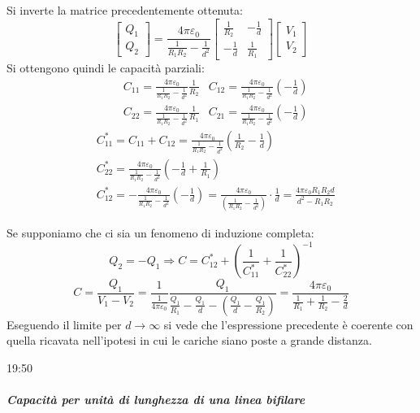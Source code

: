 Si inverte la matrice precedentemente ottenuta:
$$
\begin{bmatrix}
Q_1\\
Q_2
\end{bmatrix} = \frac{4\pi \varepsilon_0}{\frac{1}{R_1R_2}-\frac{1}{d^2}} \begin{bmatrix}
\frac{1}{R_2} & -\frac{1}{d}\\
-\frac{1}{d} & \frac{1}{R_1}
\end{bmatrix}\begin{bmatrix}
V_1 \\
V_2
\end{bmatrix}
$$
Si ottengono quindi le capacità parziali:
\begin{align*}
&C_{11} = \frac{4\pi\varepsilon_0}{\frac{1}{R_1R_2}-\frac{1}{d^2}}\frac{1}{R_2} & C_{12} = 
\frac{4\pi\varepsilon_0}{\frac{1}{R_1R_2}-\frac{1}{d^2}}\left(-\frac{1}{d}\right)\\
&C_{22} = \frac{4\pi\varepsilon_0}{\frac{1}{R_1R_2}-\frac{1}{d^2}}\frac{1}{R_1} & C_{21} = 
\frac{4\pi\varepsilon_0}{\frac{1}{R_1R_2}-\frac{1}{d^2}}\left(-\frac{1}{d}\right)
\end{align*}
\begin{align*}
&C_{11}^* = C_{11} + C_{12} = \frac{4\pi\varepsilon_0}{\frac{1}{R_1R_2}-\frac{1}{d^2}}
\left(\frac{1}{R_2} - \frac{1}{d}\right)\\
&C_{22}^* = \frac{4\pi\varepsilon_0}{\frac{1}{R_1R_2}-\frac{1}{d^2}}
\left(-\frac{1}{d} + \frac{1}{R_1}\right)\\
&C_{12}^* = -\frac{4 \pi \varepsilon_0}{\frac{1}{R_1R_2}-\frac{1}{d^2}}\left(-\frac{1}{d}\right) =
\frac{4 \pi \varepsilon_0}{\left(\frac{1}{R_1R_2} - \frac{1}{d^2}\right)}\cdot\frac{1}{d} = \frac{4\pi\varepsilon_0 R_1R_2d}{d^2-R_1R_2}
\end{align*}

Se supponiamo che ci sia un fenomeno di induzione completa: 
$$
Q_2 = -Q_1 \Rightarrow C = C_{12}^* +
\left(\frac{1}{C_{11}^*} + \frac{1}{C_{22}^*}\right)^{-1}
$$
$$
C = \frac{Q_1}{V_1-V_2} = \frac{1}{\frac{1}{4\pi\varepsilon_0}}\frac{Q_1}{\frac{Q_1}{R_1} -
\frac{Q_1}{d}-\left(\frac{Q_1}{d}-\frac{Q_1}{R_2}\right)} =
\frac{4\pi\varepsilon_0}{\frac{1}{R_1} + \frac{1}{R_2} - \frac{2}{d}}
$$
Eseguendo il limite per $d\to \infty$ si vede che l'espressione precedente è coerente con quella 
ricavata nell'ipotesi in cui le cariche siano poste a grande distanza.

19:50
\subparagraph{Capacità per unità di lunghezza di una linea bifilare}


